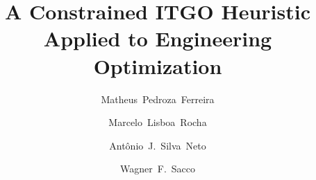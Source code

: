 \begin{frontmatter}

\title{A Constrained ITGO Heuristic \\ Applied to Engineering Optimization}





\author[label1]{Matheus~Pedroza~Ferreira}

\author[label1]{Marcelo~Lisboa~Rocha}

\author[label2]{Ant\^onio~J.~Silva~Neto}

\author[label3]{Wagner~F.~Sacco}



\address[label1]{Departamento de Ci\^encia da Computa\c{c}\~ao, Universidade Federal do Tocantins, Quadra 109 Norte, Avenida NS-15, ALCNO-14, Palmas, Tocantins, Brazil}

\address[label2]{Departamento de Engenharia Mec\^anica e Energia, Instituto Polit\'ecnico, Universidade do Estado do Rio de Janeiro, IPRJ/UERJ, RJ, Brazil}

\address[label3]{Instituto de Engenharia e Geociências, Universidade Federal do Oeste do Pará, PA, Brazil}













\iffalse




\end{frontmatter}
